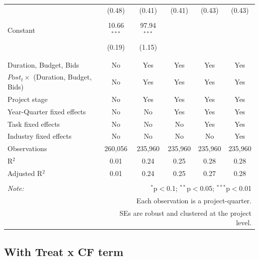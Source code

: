 \documentclass[
]{article}
\begin{document}
\begin{table}[H]
\begin{tabular}{@{\extracolsep{-2pt}}lccccc}
  & (0.48) & (0.41) & (0.41) & (0.43) & (0.43) \\ 
  & & & & & \\ 
 Constant & 10.66$^{***}$ & 97.94$^{***}$ &  &  &  \\ 
  & (0.19) & (1.15) &  &  &  \\ 
  & & & & & \\ 
\hline \\[-1.8ex] 
Duration, Budget, Bids & No & Yes & Yes & Yes & Yes \\ 
$Post_t \times $  (Duration, Budget, Bids) & No & Yes & Yes & Yes & Yes \\ 
Project stage & No & Yes & Yes & Yes & Yes \\ 
Year-Quarter fixed effects & No & No & Yes & Yes & Yes \\ 
Task fixed effects & No & No & No & Yes & Yes \\ 
Industry fixed effects & No & No & No & No & Yes \\ 
Observations & 260,056 & 235,960 & 235,960 & 235,960 & 235,960 \\ 
R$^{2}$ & 0.01 & 0.24 & 0.25 & 0.28 & 0.28 \\ 
Adjusted R$^{2}$ & 0.01 & 0.24 & 0.25 & 0.27 & 0.28 \\ 
\hline 
\hline \\[-1.8ex] 
\textit{Note:}  & \multicolumn{5}{r}{$^{*}$p$<$0.1; $^{**}$p$<$0.05; $^{***}$p$<$0.01} \\ 
 & \multicolumn{5}{r}{Each observation is a project-quarter.} \\ 
 & \multicolumn{5}{r}{SEs are robust and clustered at the project level.} \\ 
\end{tabular} 
\end{table}

\hypertarget{with-treat-x-cf-term}{%
\subsection{With Treat x CF term}\label{with-treat-x-cf-term}}
\end{document}
